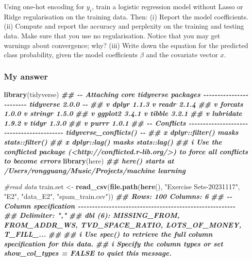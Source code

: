 \documentclass[
]{article}
\newenvironment{Shaded}{\begin{snugshade}}{\end{snugshade}}
\newcommand{\CommentTok}[1]{\textcolor[rgb]{0.56,0.35,0.01}{\textit{#1}}}
\newcommand{\DocumentationTok}[1]{\textcolor[rgb]{0.56,0.35,0.01}{\textbf{\textit{#1}}}}
\newcommand{\FunctionTok}[1]{\textcolor[rgb]{0.13,0.29,0.53}{\textbf{#1}}}
\newcommand{\NormalTok}[1]{#1}
\newcommand{\OtherTok}[1]{\textcolor[rgb]{0.56,0.35,0.01}{#1}}
\newcommand{\StringTok}[1]{\textcolor[rgb]{0.31,0.60,0.02}{#1}}
\begin{document}
Using one-hot encoding for \(y_i\), train a logistic regression model
without Lasso or Ridge regularisation on the training data. Then: (i)
Report the model coeﬀicients. (ii) Compute and report the accuracy and
perplexity on the training and testing data. Make sure that you use no
regularisation. Notice that you may get warnings about convergence; why?
(iii) Write down the equation for the predicted class probability, given
the model coeﬀicients \(\beta\) and the covariate vector \(x\).

\hypertarget{my-answer}{%
\subsubsection{My answer}\label{my-answer}}

\begin{Shaded}
\begin{Highlighting}[]

\FunctionTok{library}\NormalTok{(tidyverse)}
\DocumentationTok{\#\# {-}{-} Attaching core tidyverse packages {-}{-}{-}{-}{-}{-}{-}{-}{-}{-}{-}{-}{-}{-}{-}{-}{-}{-}{-}{-}{-}{-}{-}{-} tidyverse 2.0.0 {-}{-}}
\DocumentationTok{\#\# v dplyr     1.1.3     v readr     2.1.4}
\DocumentationTok{\#\# v forcats   1.0.0     v stringr   1.5.0}
\DocumentationTok{\#\# v ggplot2   3.4.1     v tibble    3.2.1}
\DocumentationTok{\#\# v lubridate 1.9.2     v tidyr     1.3.0}
\DocumentationTok{\#\# v purrr     1.0.1     }
\DocumentationTok{\#\# {-}{-} Conflicts {-}{-}{-}{-}{-}{-}{-}{-}{-}{-}{-}{-}{-}{-}{-}{-}{-}{-}{-}{-}{-}{-}{-}{-}{-}{-}{-}{-}{-}{-}{-}{-}{-}{-}{-}{-}{-}{-}{-}{-}{-}{-} tidyverse\_conflicts() {-}{-}}
\DocumentationTok{\#\# x dplyr::filter() masks stats::filter()}
\DocumentationTok{\#\# x dplyr::lag()    masks stats::lag()}
\DocumentationTok{\#\# i Use the conflicted package (\textless{}http://conflicted.r{-}lib.org/\textgreater{}) to force all conflicts to become errors}
\FunctionTok{library}\NormalTok{(here)}
\DocumentationTok{\#\# here() starts at /Users/rongguang/Music/Projects/machine learning}

\CommentTok{\#read data}
\NormalTok{train.set }\OtherTok{\textless{}{-}} 
  \FunctionTok{read\_csv}\NormalTok{(}\FunctionTok{file.path}\NormalTok{(}\FunctionTok{here}\NormalTok{(), }\StringTok{"Exercise Sets{-}20231117"}\NormalTok{, }\StringTok{"E2"}\NormalTok{, }\StringTok{"data\_E2"}\NormalTok{, }\StringTok{"spam\_train.csv"}\NormalTok{))}
\DocumentationTok{\#\# Rows: 100 Columns: 6}
\DocumentationTok{\#\# {-}{-} Column specification {-}{-}{-}{-}{-}{-}{-}{-}{-}{-}{-}{-}{-}{-}{-}{-}{-}{-}{-}{-}{-}{-}{-}{-}{-}{-}{-}{-}{-}{-}{-}{-}{-}{-}{-}{-}{-}{-}{-}{-}{-}{-}{-}{-}{-}{-}{-}{-}{-}{-}{-}{-}{-}{-}{-}{-}}
\DocumentationTok{\#\# Delimiter: ","}
\DocumentationTok{\#\# dbl (6): MISSING\_FROM, FROM\_ADDR\_WS, TVD\_SPACE\_RATIO, LOTS\_OF\_MONEY, T\_FILL\_...}
\DocumentationTok{\#\# }
\DocumentationTok{\#\# i Use \textasciigrave{}spec()\textasciigrave{} to retrieve the full column specification for this data.}
\DocumentationTok{\#\# i Specify the column types or set \textasciigrave{}show\_col\_types = FALSE\textasciigrave{} to quiet this message.}


\end{Highlighting}
\end{Shaded}
\end{document}
